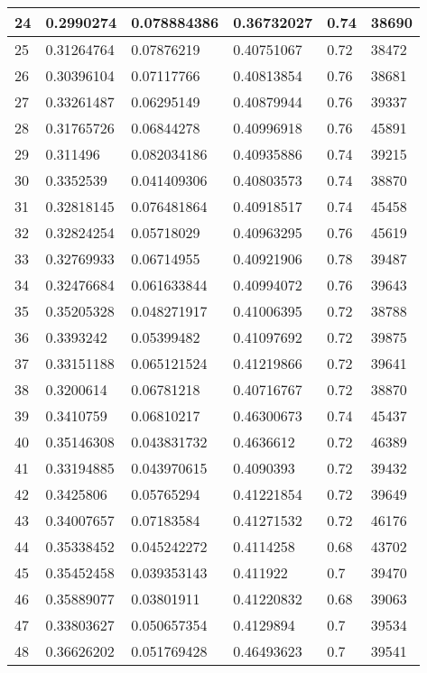 \begin{longtable}{|l|l|l|l|l|l|}
24 & 0.2990274 & 0.078884386 & 0.36732027 & 0.74 & 38690 \\ \hline 
25 & 0.31264764 & 0.07876219 & 0.40751067 & 0.72 & 38472 \\ \hline 
26 & 0.30396104 & 0.07117766 & 0.40813854 & 0.76 & 38681 \\ \hline 
27 & 0.33261487 & 0.06295149 & 0.40879944 & 0.76 & 39337 \\ \hline 
28 & 0.31765726 & 0.06844278 & 0.40996918 & 0.76 & 45891 \\ \hline 
29 & 0.311496 & 0.082034186 & 0.40935886 & 0.74 & 39215 \\ \hline 
30 & 0.3352539 & 0.041409306 & 0.40803573 & 0.74 & 38870 \\ \hline 
31 & 0.32818145 & 0.076481864 & 0.40918517 & 0.74 & 45458 \\ \hline 
32 & 0.32824254 & 0.05718029 & 0.40963295 & 0.76 & 45619 \\ \hline 
33 & 0.32769933 & 0.06714955 & 0.40921906 & 0.78 & 39487 \\ \hline 
34 & 0.32476684 & 0.061633844 & 0.40994072 & 0.76 & 39643 \\ \hline 
35 & 0.35205328 & 0.048271917 & 0.41006395 & 0.72 & 38788 \\ \hline 
36 & 0.3393242 & 0.05399482 & 0.41097692 & 0.72 & 39875 \\ \hline 
37 & 0.33151188 & 0.065121524 & 0.41219866 & 0.72 & 39641 \\ \hline 
38 & 0.3200614 & 0.06781218 & 0.40716767 & 0.72 & 38870 \\ \hline 
39 & 0.3410759 & 0.06810217 & 0.46300673 & 0.74 & 45437 \\ \hline 
40 & 0.35146308 & 0.043831732 & 0.4636612 & 0.72 & 46389 \\ \hline 
41 & 0.33194885 & 0.043970615 & 0.4090393 & 0.72 & 39432 \\ \hline 
42 & 0.3425806 & 0.05765294 & 0.41221854 & 0.72 & 39649 \\ \hline 
43 & 0.34007657 & 0.07183584 & 0.41271532 & 0.72 & 46176 \\ \hline 
44 & 0.35338452 & 0.045242272 & 0.4114258 & 0.68 & 43702 \\ \hline 
45 & 0.35452458 & 0.039353143 & 0.411922 & 0.7 & 39470 \\ \hline 
46 & 0.35889077 & 0.03801911 & 0.41220832 & 0.68 & 39063 \\ \hline 
47 & 0.33803627 & 0.050657354 & 0.4129894 & 0.7 & 39534 \\ \hline 
48 & 0.36626202 & 0.051769428 & 0.46493623 & 0.7 & 39541 \\ \hline 

\end{longtable}
